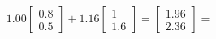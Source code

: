 \documentclass[preview]{standalone}
\begin{document}
\begin{align*}
1.00 \begin{bmatrix} 0.8 \\ 0.5 \end{bmatrix} + 1.16 \begin{bmatrix} 1 \\ 1.6 \end{bmatrix} = \begin{bmatrix} 1.96 \\ 2.36 \end{bmatrix} =
\end{align*}
\end{document}
